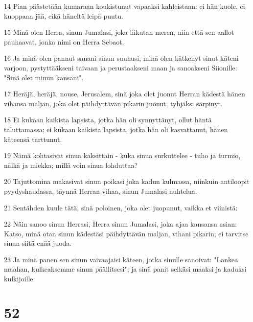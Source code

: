 \par 14 Pian päästetään kumaraan koukistunut vapaaksi kahleistaan: ei hän kuole, ei kuoppaan jää, eikä häneltä leipä puutu.
\par 15 Minä olen Herra, sinun Jumalasi, joka liikutan meren, niin että sen aallot pauhaavat, jonka nimi on Herra Sebaot.
\par 16 Ja minä olen pannut sanani sinun suuhusi, minä olen kätkenyt sinut käteni varjoon, pystyttääkseni taivaan ja perustaakseni maan ja sanoakseni Siionille: "Sinä olet minun kansani".
\par 17 Heräjä, heräjä, nouse, Jerusalem, sinä joka olet juonut Herran kädestä hänen vihansa maljan, joka olet päihdyttävän pikarin juonut, tyhjäksi särpinyt.
\par 18 Ei kukaan kaikista lapsista, jotka hän oli synnyttänyt, ollut häntä taluttamassa; ei kukaan kaikista lapsista, jotka hän oli kasvattanut, hänen käteensä tarttunut.
\par 19 Nämä kohtasivat sinua kaksittain - kuka sinua surkuttelee - tuho ja turmio, nälkä ja miekka; millä voin sinua lohduttaa?
\par 20 Tajuttomina makasivat sinun poikasi joka kadun kulmassa, niinkuin antiloopit pyydyshaudassa, täynnä Herran vihaa, sinun Jumalasi nuhtelua.
\par 21 Sentähden kuule tätä, sinä poloinen, joka olet juopunut, vaikka et viinistä:
\par 22 Näin sanoo sinun Herrasi, Herra sinun Jumalasi, joka ajaa kansansa asian: Katso, minä otan sinun kädestäsi päihdyttävän maljan, vihani pikarin; ei tarvitse sinun siitä enää juoda.
\par 23 Ja minä panen sen sinun vaivaajaisi käteen, jotka sinulle sanoivat: "Lankea maahan, kulkeaksemme sinun päällitsesi"; ja sinä panit selkäsi maaksi ja kaduksi kulkijoille.

\chapter{52}

